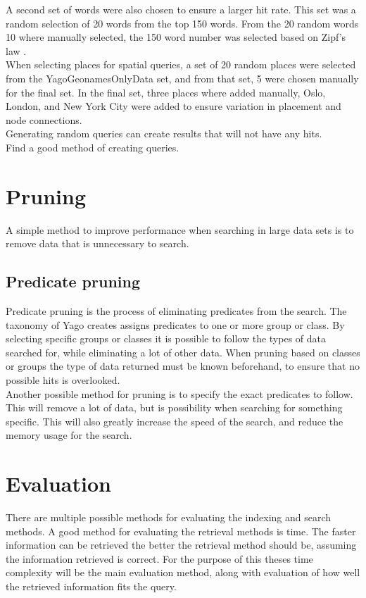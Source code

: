 A second set of words were also chosen to ensure a larger hit rate. This set was a random selection of 20 words from the top 150 words. From the 20 random words 10 where manually selected, the 150 word number was selected based on Zipf's law \cite{zipf}.\\

When selecting places for spatial queries, a set of 20 random places were selected from the YagoGeonamesOnlyData set, and from that set, 5 were chosen manually for the final set. In the final set, three places where added manually, Oslo, London, and New York City were added to ensure variation in placement and node connections.\\

Generating random queries can create results that will not have any hits.\\
Find a good method of creating queries.\\

\section{Pruning}
A simple method to improve performance when searching in large data sets is to remove data that is unnecessary to search.

\subsection{Predicate pruning}
Predicate pruning is the process of eliminating predicates from the search. The taxonomy of Yago creates assigns predicates to one or more group or class. By selecting specific groups or classes it is possible to follow the types of data searched for, while eliminating a lot of other data. When pruning based on classes or groups the type of data returned must be known beforehand, to ensure that no possible hits is overlooked.\\

Another possible method for pruning is to specify the exact predicates to follow. This will remove a lot of data, but is possibility when searching for something specific. This will also greatly increase the speed of the search, and reduce the memory usage for the search. 

\section{Evaluation}
There are multiple possible methods for evaluating the indexing and search methods. A good method for evaluating the retrieval methods is time. The faster information can be retrieved the better the retrieval method should be, assuming the information retrieved is correct. For the purpose of this theses time complexity will be the main evaluation method, along with evaluation of how well the retrieved information fits the query.\\

